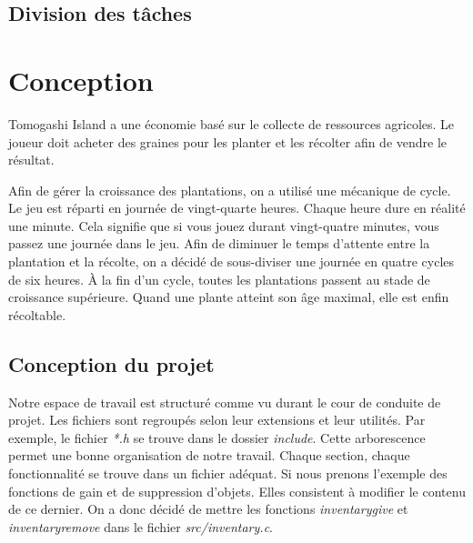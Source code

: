 \documentclass{article}
\begin{document}
\subsection{Division des tâches}
\section{Conception}
Tomogashi Island a une économie basé sur le collecte de ressources agricoles. Le joueur doit acheter des graines pour les planter et les récolter afin de vendre le résultat.

    
    Afin de gérer la croissance des plantations,  on a utilisé une mécanique de cycle. Le jeu est réparti en journée de vingt-quarte heures. Chaque heure dure en réalité une minute. Cela signifie que si vous jouez durant vingt-quatre minutes, vous passez une journée dans le jeu. Afin de diminuer le temps d’attente entre la plantation et la récolte, on a décidé de sous-diviser une journée en quatre cycles de six heures. À la fin d’un cycle, toutes les plantations passent au stade de croissance supérieure. Quand une plante atteint son âge maximal, elle est enfin récoltable.
    
\subsection{Conception du projet}

 Notre espace de travail est structuré comme vu durant le cour de conduite de projet. Les fichiers sont regroupés selon leur extensions et leur utilités. Par exemple, le fichier \textit{*.h} se trouve dans le dossier \textit{include}. Cette arborescence permet une bonne organisation de notre travail. Chaque section, chaque fonctionnalité se trouve dans un fichier adéquat. Si nous prenons l'exemple des fonctions de gain et de suppression d'objets. Elles consistent à modifier le contenu de ce dernier. On a donc décidé de mettre les fonctions \textit{inventary\textunderscore give} et \textit{inventary\textunderscore remove} dans le fichier \textit{src/inventary.c}.
\end{document}
